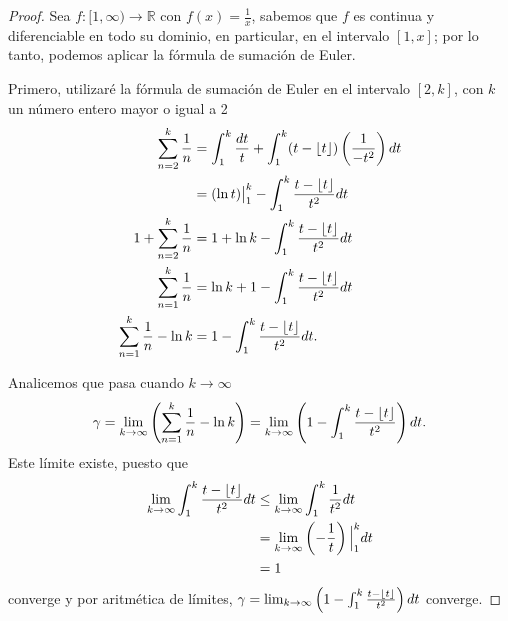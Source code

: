 \documentclass{article}
\DeclarePairedDelimiter\floor{\lfloor}{\rfloor}
\theoremstyle{definition}
\theoremstyle{remark}
\newcommand{\BR}{\mathbb R}
\begin{document}
\begin{proof}
Sea $f : [1, \infty) \to \BR$ con $f(x) = \frac{1}{x}$, sabemos que $f$ es continua y diferenciable en todo su dominio,
en particular, en el intervalo $[1, x]$; por lo tanto, podemos aplicar la f\'ormula de sumaci\'on de Euler.

Primero, utilizar\'e la f\'ormula de sumaci\'on de Euler en el intervalo $[2, k]$, con $k$ un n\'umero entero mayor o igual a 2
\begin{align*}
\sum_{n = 2}^k \frac{1}{n} &= \int_1^k \frac{dt}{t} + \int_{1}^k (t - \floor{t})\left(\frac{1}{-t^2}\right) dt \\
&= (\ln t) \big|_1^k - \int_1^k \frac{t - \floor{t}}{t^2} dt \\
1 + \sum_{n = 2}^k \frac{1}{n} &= 1 + \ln k - \int_1^k \frac{t - \floor{t}}{t^2} dt \\
\sum_{n = 1}^k \frac{1}{n} &= \ln k + 1 - \int_1^k \frac{t - \floor{t}}{t^2} dt \\
\sum_{n = 1}^k \frac{1}{n} - \ln k &= 1 - \int_1^k \frac{t - \floor{t}}{t^2} dt.
\end{align*}

Analicemos que pasa cuando $k \to \infty$
$$\gamma = \lim_{k \to \infty} \left(\sum_{n = 1}^k \frac{1}{n} - \ln k\right) 
= \lim_{k \to \infty} \left(1 - \int_1^k \frac{t - \floor{t}}{t^2}\right) dt.$$
Este l\'imite existe, puesto que
\begin{align*}
\lim_{k \to \infty} \int_1^k \frac{t - \floor{t}}{t^2} dt &\leq \lim_{k \to \infty} \int_1^k \frac{1}{t^2} dt \\
&= \lim_{k \to \infty} \left(-\frac{1}{t}\right)\Big|_1^k dt \\
&= 1
\end{align*}
converge y por aritm\'etica de l\'imites, $\gamma = \lim_{k \to \infty} \left(1 - \int_1^k \frac{t - \floor{t}}{t^2}\right) dt$ converge.


\end{proof}
\end{document}
